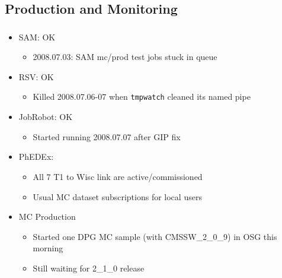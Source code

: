 \documentclass{beamer}
\begin{document}
\subsection{Production and Monitoring}
\begin{frame}
\frametitle{}
\begin{itemize}
    \item SAM: OK
    \begin{itemize}
        \item 2008.07.03: SAM mc/prod test jobs stuck in queue
    \end{itemize}
    \item RSV: OK
    \begin{itemize}
        \item Killed 2008.07.06-07 when {\tt tmpwatch} cleaned its named pipe
    \end{itemize}
    \item JobRobot: OK
    \begin{itemize}
        \item Started running 2008.07.07 after GIP fix
    \end{itemize}
    \item PhEDEx:
    \begin{itemize}
        \item All 7 T1 to Wisc link are active/commissioned
        \item Usual MC dataset subscriptions for local users
    \end{itemize}
    \item MC Production
    \begin{itemize}
        \item Started one DPG MC sample (with CMSSW\_2\_0\_9) in OSG this morning
        \item Still waiting for 2\_1\_0 release
    \end{itemize}
\end{itemize}
\end{frame}
\end{document}
